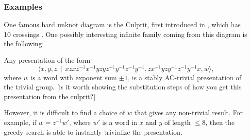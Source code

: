 \subsubsection{Examples}
One famous hard unknot diagram is the Culprit, first introduced in \cite{kauffman2014hardunknotscollapsingtangles}, which has 10 crossings . One possibly interesting infinite family coming from this diagram is the following:
\begin{proposition}
    Any presentation of the form 
    \[
\langle x,y,z \,\mid \, xzxz^{-1}x^{-1}yzyz^{-1}y^{-1}z^{-1}y^{-1}, zx^{-1}yzy^{-1}z^{-1}y^{-1}x, w \rangle,
\] where $w$ is a word with exponent sum $\pm 1$, is a stably AC-trivial presentation of the trivial group. [is it worth showing the substitution steps of how you get this presentation from the culprit?]
\end{proposition}
However, it is difficult to find a choice of $w$ that gives any non-trivial result. For example, if $w=z^{-1}w'$, where $w'$ is a word in $x$ and $y$ of length $\leq 8$, then the greedy search is able to instantly trivialize the presentation. 